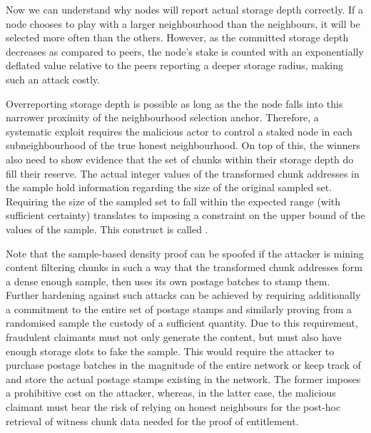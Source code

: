 Now we can understand why nodes will report actual storage depth correctly. If a node chooses to play with a larger neighbourhood than the neighbours, it will be selected more often than the others. However, as the committed storage depth decreases as compared to peers, the node's stake is counted with an exponentially deflated  value relative to the peers reporting a deeper storage radius, making such an attack costly.  

Overreporting storage depth is possible as long as the the node falls into this narrower proximity of the neighbourhood selection anchor. Therefore, a systematic exploit requires the malicious actor to control a staked node in each subneighbourhood of the true honest neighbourhood. 
On top of this, the winners also need to show evidence that the set of chunks within their storage depth do fill their reserve. 
The actual integer values of the transformed chunk addresses in the sample hold information regarding the size of the original sampled set.  
Requiring the size of the sampled set to fall within the expected range (with sufficient certainty) translates to imposing a constraint on the upper bound of the values of the sample. This construct is called %
.
%

Note that the sample-based density proof can be spoofed if the attacker is mining content filtering chunks in such a way that the transformed chunk addresses form a dense enough sample, then uses its own postage batches to stamp them. 
Further hardening against such attacks can be achieved by requiring  additionally a commitment to the entire set of postage stamps and similarly proving from a randomised sample the custody of a sufficient quantity. Due to this requirement, fraudulent claimants must not only generate the content, but must also have enough storage slots to fake the sample. This would require the attacker to purchase postage batches in the magnitude of the entire network 
or keep track of and store the actual postage stamps existing in the network. The former imposes a prohibitive cost on the attacker, whereas, in the latter case, the malicious claimant must bear the risk of relying on honest  neighbours for the post-hoc retrieval of witness chunk data needed for the proof of entitlement.



